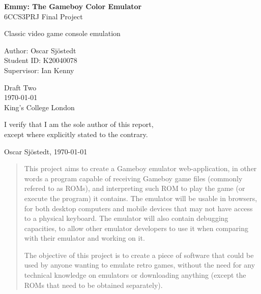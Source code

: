 \documentclass[11pt]{report}
\begin{document}

\begin{titlepage}
    \begin{center}
        \vspace*{1cm}

        \Huge
        \textbf{Emmy: The Gameboy Color Emulator}\\
        6CCS3PRJ Final Project

        \vspace{1.5cm}
        \Large
        Classic video game console emulation

        \vfill

        Author: Oscar Sjöstedt\\
        Student ID: K20040078\\
        Supervisor: Ian Kenny

        \vspace{1.5cm}

        \Large
        Draft Two \\
        \today \\
        King's College London \\

    \end{center}
\end{titlepage}

\null\vfill

\clearpage

\vspace*{\fill}
\begin{center}
	I verify that I am the sole author of this report, \\
	except where explicitly stated  to the contrary.

	Oscar Sjöstedt, \today
\end{center}
\vspace*{\fill}

\begin{abstract}
    This project aims to create a Gameboy emulator web-application, in other words a program capable of receiving Gameboy game files (commonly refered to as ROMs), and interpreting such ROM to play the game (or execute the program) it contains. The emulator will be usable in browsers, for both desktop computers and mobile devices that may not have access to a physical keyboard. The emulator will also contain debugging capacities, to allow other emulator developers to use it when comparing with their emulator and working on it.

    The objective of this project is to create a piece of software that could be used by anyone wanting to emulate retro games, without the need for any technical knowledge on emulators or downloading anything (except the ROMs that need to be obtained separately).
\end{abstract}
\vfill
\end{document}
